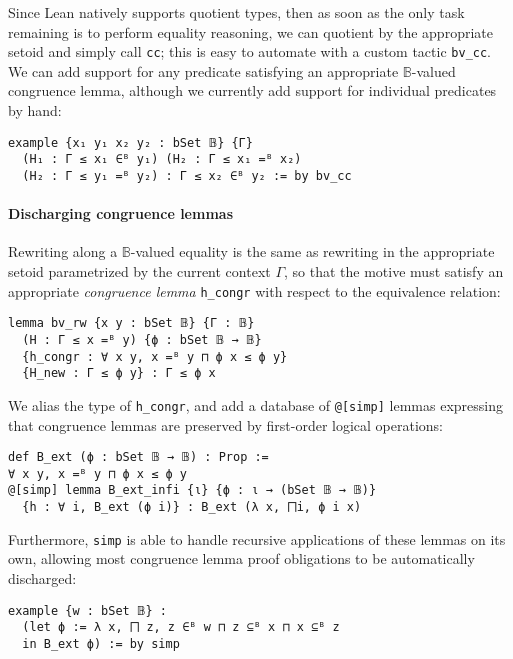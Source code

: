 \documentclass[sigplan,10pt,review]{acmart}
\newcommand{\lil}{\lstinline}
\theoremstyle{definition}
\begin{document}
Since Lean natively supports quotient types, then as soon as the only task remaining is to perform equality reasoning,
we can quotient by the appropriate setoid and simply call \lil{cc};
this is easy to automate with a custom tactic \lil{bv_cc}. %
We can add support for any predicate satisfying an appropriate \(\mathbb{B}\)-valued congruence lemma,
although we currently add support for individual predicates by hand:
\begin{lstlisting}
example {x₁ y₁ x₂ y₂ : bSet 𝔹} {Γ}
  (H₁ : Γ ≤ x₁ ∈ᴮ y₁) (H₂ : Γ ≤ x₁ =ᴮ x₂)
  (H₂ : Γ ≤ y₁ =ᴮ y₂) : Γ ≤ x₂ ∈ᴮ y₂ := by bv_cc
\end{lstlisting}
\paragraph{Discharging congruence lemmas} \label{subsect:B-ext}
Rewriting along a \(\mathbb{B}\)-valued equality is the same as rewriting in the appropriate setoid parametrized by the current context \(\Gamma\), %
so that the motive must satisfy an appropriate \emph{congruence lemma} \lil{h_congr} with respect to the equivalence relation:
\begin{lstlisting}
lemma bv_rw {x y : bSet 𝔹} {Γ : 𝔹}
  (H : Γ ≤ x =ᴮ y) {ϕ : bSet 𝔹 → 𝔹}
  {h_congr : ∀ x y, x =ᴮ y ⊓ ϕ x ≤ ϕ y}
  {H_new : Γ ≤ ϕ y} : Γ ≤ ϕ x
\end{lstlisting}
We alias the type of \lil{h_congr}, and add a database of \lil{@[simp]} lemmas expressing that congruence lemmas are preserved by first-order logical operations:
\begin{lstlisting}
def B_ext (ϕ : bSet 𝔹 → 𝔹) : Prop :=
∀ x y, x =ᴮ y ⊓ ϕ x ≤ ϕ y
@[simp] lemma B_ext_infi {ι} {ϕ : ι → (bSet 𝔹 → 𝔹)}
  {h : ∀ i, B_ext (ϕ i)} : B_ext (λ x, ⨅i, ϕ i x)
\end{lstlisting}
Furthermore, \lil{simp} is able to handle recursive applications of these lemmas on its own, allowing most congruence lemma proof obligations to be automatically discharged:
\begin{lstlisting}
example {w : bSet 𝔹} :
  (let ϕ := λ x, ⨅ z, z ∈ᴮ w ⊓ z ⊆ᴮ x ⊓ x ⊆ᴮ z
  in B_ext ϕ) := by simp
\end{lstlisting}
\end{document}
